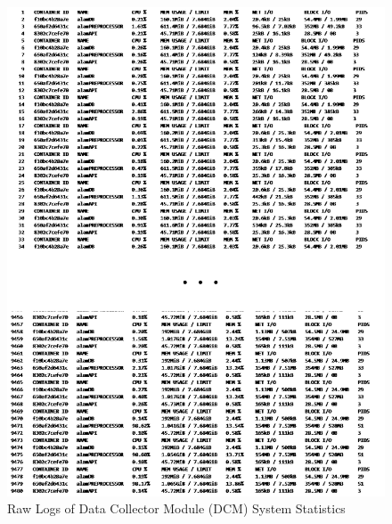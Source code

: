 \begin{figure}[ht]
    \centering
    \includegraphics[height=0.80\textheight]{./assets/Appendices/B/RawTestsData/RawLogs/DCMStats.png}
    \caption{Raw Logs of Data Collector Module (DCM) System Statistics}
    \label{fig:DCMStats}
\end{figure}
\FloatBarrier


